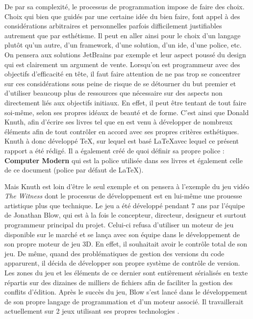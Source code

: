 \documentclass[12pt]{article} %
\begin{document}
De par sa complexité, le processus de programmation impose de faire des choix. Choix qui bien que guidés par une certaine idée du bien faire, font appel à des considérations arbitraires et personnelles parfois difficilement justifiables autrement que par esthétisme. Il peut en aller ainsi pour le choix d'un langage plutôt qu'un autre, d'un framework, d'une solution, d'un \acrshort{ide}, d'une police, etc. On pensera aux solutions JetBrains par exemple et leur aspect poussé du design qui est clairement un argument de vente. Lorsqu'on est programmeur avec des objectifs d'efficacité en tête, il faut faire attention de ne pas trop se concentrer sur ces considérations sous peine de risque de se détourner du but premier et d'utiliser beaucoup plus de ressources que nécessaire sur des aspects non directement liés aux objectifs initiaux. En effet, il peut être tentant de tout faire soi-même, selon ses propres idéaux de beauté et de forme. C'est ainsi que Donald Knuth, afin d'écrire ses livres tel que  \cite{DKnuth1997} en est venu à développer de nombreux éléments afin de tout contrôler en accord avec ses propres critères esthétiques. Knuth à donc développé TeX, sur lequel est basé \LaTeX\space avec lequel ce présent rapport a été rédigé. Il a également créé de quoi définir sa propre police : \textbf{Computer Modern} qui est la police utilisée dans ses livres et également celle de ce document (police par défaut de \LaTeX). 

Mais Knuth est loin d'être le seul exemple et on pensera à l'exemple du jeu vidéo \textit{The Witness} dont le processus de développement est en lui-même une prouesse artistique plus que technique. Le jeu a été développé pendant 7 ans par l'équipe de Jonathan Blow, qui est à la fois le concepteur, directeur, designeur et surtout programmeur principal du projet. Celui-ci refusa d'utiliser un moteur de jeu disponible sur le marché et se lança avec son équipe dans le développement de son propre moteur de jeu 3D. En effet, il souhaitait avoir le contrôle total de son jeu. De même, quand des problématiques de gestion des versions du code apparurent, il décida de développer son propre système de contrôle de version. Les zones du jeu et les éléments de ce dernier sont entièrement sérialisés en texte répartis sur des dizaines de milliers de fichiers afin de faciliter la gestion des conflits d'édition. Après le succès du jeu, Blow s'est lancé dans le développement de son propre langage de programmation et d'un moteur associé. Il travaillerait actuellement sur 2 jeux utilisant ses propres technologies \cite{Takahashi2018-cb}.
\end{document}
